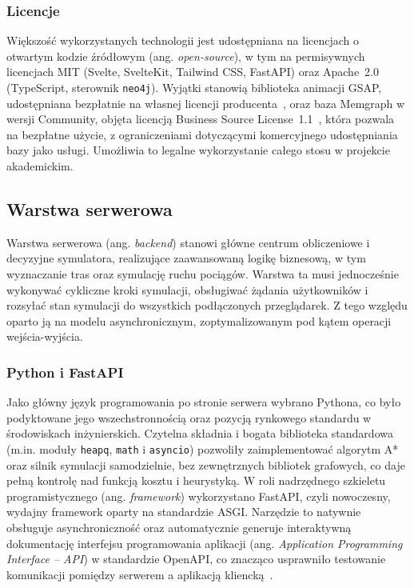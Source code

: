 \documentclass[twoside]{projektInzynierskiMS1z}
\begin{document}
\subsubsection{Licencje}

Większość wykorzystanych technologii jest udostępniana na licencjach o otwartym
kodzie źródłowym (ang. \emph{open-source}), w tym na permisywnych licencjach MIT
(Svelte, SvelteKit, Tailwind CSS, FastAPI) oraz Apache~2.0 (TypeScript,
sterownik \texttt{neo4j}). Wyjątki stanowią biblioteka animacji GSAP,
udostępniana bezpłatnie na własnej licencji producenta~\cite{gsaplicense}, oraz
baza Memgraph w wersji Community, objęta licencją Business Source
License~1.1~\cite{memgraphlicense}, która pozwala na bezpłatne użycie,
z ograniczeniami dotyczącymi komercyjnego udostępniania bazy jako usługi.
Umożliwia to legalne wykorzystanie całego stosu w projekcie akademickim.

\subsection{Warstwa serwerowa}

Warstwa serwerowa (ang. \emph{backend}) stanowi główne centrum obliczeniowe i decyzyjne
symulatora, realizujące zaawansowaną logikę biznesową, w tym wyznaczanie tras oraz
symulację ruchu pociągów. Warstwa ta musi jednocześnie wykonywać cykliczne kroki symulacji, obsługiwać
żądania użytkowników i rozsyłać stan symulacji do wszystkich podłączonych
przeglądarek. Z tego względu oparto ją na modelu asynchronicznym,
zoptymalizowanym pod kątem operacji wejścia-wyjścia.

\subsubsection{Python i FastAPI}

Jako główny język programowania po stronie serwera wybrano Pythona, co było podyktowane
jego wszechstronnością oraz pozycją rynkowego standardu w środowiskach inżynierskich.
Czytelna składnia i bogata biblioteka standardowa (m.in. moduły \texttt{heapq},
\texttt{math} i \texttt{asyncio}) pozwoliły zaimplementować algorytm A* oraz
silnik symulacji samodzielnie, bez zewnętrznych bibliotek grafowych, co daje
pełną kontrolę nad funkcją kosztu i heurystyką. W roli nadrzędnego szkieletu programistycznego (ang. \emph{framework})
wykorzystano FastAPI, czyli nowoczesny, wydajny framework oparty na standardzie ASGI. Narzędzie to natywnie obsługuje asynchroniczność oraz
automatycznie generuje interaktywną dokumentację interfejsu programowania aplikacji
(ang. \emph{Application Programming Interface -- API}) w standardzie OpenAPI, co znacząco
usprawniło testowanie komunikacji pomiędzy serwerem a aplikacją kliencką~\cite{fastapi}.
\end{document}
